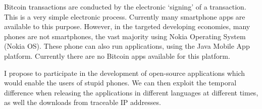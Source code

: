 \documentclass[a4paper]{report}\usepackage{graphicx, color}
\begin{document}
\begin{refsection}
Bitcoin transactions are conducted by the electronic `signing' of a transaction. This is a very simple electronic process. Currently many smartphone apps are available to this purpose. However, in the targeted developing economies, many phones are not smartphones, the vast majority using Nokia Operating System (Nokia OS). These phone can also run applications, using the Java Mobile App platform. Currently there are no Bitcoin apps available for this platform.

I propose to participate in the development of open-source applications which would enable the users of stupid phones. We can then exploit the temporal difference when releasing the applications in different languages at different times, as well the downloads from traceable IP addresses.

\printbibliography

\end{refsection}
\end{document}
